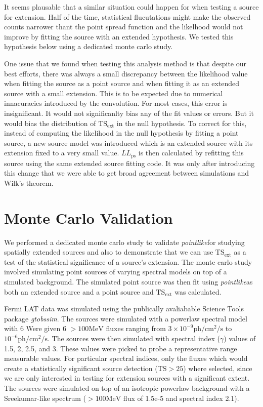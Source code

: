 \documentclass[preprint]{aastex}
\newcommand{\mev}{\text{MeV}}
\newcommand{\tsext}{\ensuremath{\text{TS}_\text{ext}}}
\newcommand{\ts}{\text{TS}}
\newcommand{\pointlike}{{\em pointlike}}
\begin{document}
It seems plausable that a similar situation could happen for when testing
a source for extension. Half of the time, statistical flucutations might
make the observed counts narrower thant the point spread function and
the likelhood would not improve by fitting the source with an extended
hypothesis. We tested this hypothesis below using a dedicated monte
carlo study.

One issue that we found when testing this analysis method is that
despite our best efforts, there was always a small discrepancy between
the likelihood value when fitting the source as a point source and when
fitting it as an extended source with a small extension.  This is to be
expected due to numerical innacuracies introduced by the convolution.
For most cases, this error is insignificant. It would not significanlty
bias any of the fit values or errors. But it would bias the distribution
of $\tsext$ in the null hypothesis. To correct for this,
instead of computing the likelihood in the null hypothesis by fitting
a point source, a new source model was introduced which is an extended
source with its extension fixed to a very small value. $LL_\text{ps}$
is then calculated by refitting this source using the same extended
source fitting code. It was only after introducing this change that we
were able to get broad agreement between simulations and Wilk's theorem.

\section{Monte Carlo Validation}

We performed a dedicated monte carlo study to validate \pointlike for
studying spatially extended sources and also to demonstrate that we can
use $\tsext$ as a test of the statistical significance
of a source's extension.  The monte carlo study involved simulating point
sources of varying spectral models on top of a simulated background. The
simulated point source was then fit using \pointlike as both an extended
source and a point source and $\tsext$ was calculated.

Fermi LAT data was simulated using the publically avaliabable Science
Tools package {\em gtobssim}\cite{GTOBSSIM_CITATION}. The sources were
simulated with a powerlaw spectral model with 6 Were given 6 $>100\mev$
fluxes ranging from $3\times 10^{-9} \text{ph}/\text{cm}^2/\text{s}$ to 
$10^{-6} \text{ph}/\text{cm}^2/\text{s}$.
The sources were then simulated with spectral index ($\gamma$) values of
1.5, 2, 2.5, and 3.  These values were picked to probe a representative
range measurable values.  For particular spectral indices, only the
fluxes which would create a statistically significant source detection
($\ts>25$) where selected, since we are only interested in
testing for extension sources with a significant extent. The sources were
simulated on top of an isotropic powerlaw background with a Sreekumar-like
spectrum ($>100\mev$ flux of 1.5e-5 and spectral index 2.1).\cite{Sreekumar
et al. ApJ 494 pag 523 1998}
\end{document}
